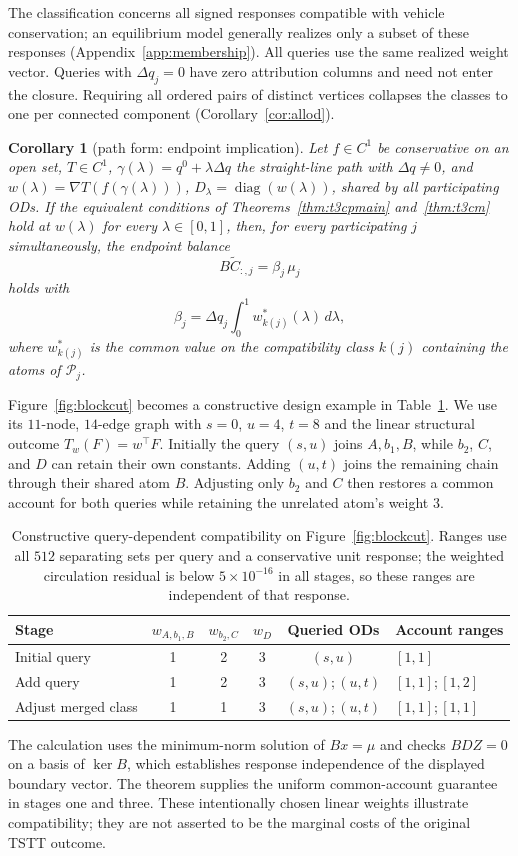 \documentclass[a4paper,fleqn]{cas-sc}
\newtheorem{corollary}[theorem]{Corollary}
\begin{document}
The classification concerns all signed responses compatible with vehicle
conservation; an equilibrium model generally realizes only a subset of
these responses (Appendix~\ref{app:membership}).
All queries use the same realized weight vector. Queries with $\Delta q_j=0$
have zero attribution columns and need not enter the closure. Requiring all
ordered pairs of distinct vertices collapses the classes to one per
connected component (Corollary~\ref{cor:allod}).


\begin{corollary}[path form: endpoint implication]\label{cor:path}
Let $f\in C^1$ be conservative on an open set, $T\in C^1$,
$\gamma(\lambda)=q^0+\lambda\Delta q$ the straight-line path with $\Delta q\ne0$, and
$w(\lambda)=\nabla T(f(\gamma(\lambda)))$, $D_\lambda=\operatorname{diag}(w(\lambda))$, shared by
all participating ODs. If the equivalent conditions of
Theorems~\ref{thm:t3cpmain} and~\ref{thm:t3cm} hold at $w(\lambda)$ for
every $\lambda\in[0,1]$, then, for every participating $j$
simultaneously, the endpoint balance
\[
B\widetilde{C}_{:,j}=\beta_j\,\mu_j
\]
holds with
\[
\beta_j=\Delta q_j\int_0^1 w^*_{k(j)}(\lambda)\,d\lambda,
\]
where $w^*_{k(j)}$
is the common value on the compatibility class $k(j)$ containing the
atoms of $\mathcal{P}_j$.
\end{corollary}

Figure~\ref{fig:blockcut} becomes a constructive design example in
Table~\ref{tab:topologyexample}. We use its $11$-node, $14$-edge graph
with $s=0$, $u=4$, $t=8$ and the linear structural outcome $T_w(F)=w^\top F$.
Initially the query $(s,u)$ joins $A,b_1,B$, while $b_2$, $C$, and
$D$ can retain their own constants. Adding $(u,t)$ joins the remaining
chain through their shared atom $B$. Adjusting only $b_2$ and $C$
then restores a common account for both queries while retaining the
unrelated atom's weight $3$.
\begin{table}[pos=tb]
\caption{Constructive query-dependent compatibility on Figure~\ref{fig:blockcut}.
Ranges use all $512$ separating sets per query and a conservative unit response;
the weighted circulation residual is below $5\times10^{-16}$ in all stages,
so these ranges are independent of that response.}\label{tab:topologyexample}
\begin{tabular*}{\tblwidth}{@{\extracolsep{\fill}}lccccl}
\toprule Stage & $w_{A,b_1,B}$ & $w_{b_2,C}$ & $w_D$ & Queried ODs & Account ranges\\\midrule
Initial query & 1 & 2 & 3 & $(s,u)$ & $[1,1]$\\
Add query & 1 & 2 & 3 & $(s,u);(u,t)$ & $[1,1];[1,2]$\\
Adjust merged class & 1 & 1 & 3 & $(s,u);(u,t)$ & $[1,1];[1,1]$\\
\bottomrule\end{tabular*}\end{table}
The calculation uses the minimum-norm solution of $Bx=\mu$ and checks
$BDZ=0$ on a basis of $\ker B$, which establishes response independence
of the displayed boundary vector. The theorem supplies the uniform
common-account guarantee in stages one and three. These intentionally
chosen linear weights illustrate compatibility; they are not asserted
to be the marginal costs of the original TSTT outcome.
\end{document}
